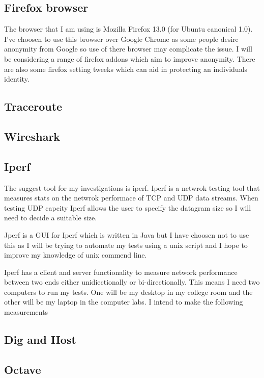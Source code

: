 \documentclass[12pt,a4paper,oneside]{article}
\begin{document}
\subsection{Firefox browser}
The browser that I am using is Mozilla Firefox 13.0 (for Ubuntu canonical 1.0). I've choosen to use this browser over Google Chrome as some people desire anonymity from Google so use of there browser may complicate the issue. I will be considering a range of firefox addons which aim to improve anonymity. There are also some firefox setting tweeks which can aid in protecting an individuals identity.

\subsection{Traceroute}
\subsection{Wireshark}
\subsection{Iperf}
The suggest tool for my investigations is iperf. Iperf is a netwrok testing tool that measures stats on the netwrok performace of TCP and UDP data streams.  When testing UDP capcity Iperf allows the user to specify the datagram size so I will need to decide a suitable size. 

Jperf is a GUI for Iperf which is written in Java but I have choosen not to use this as I will be trying to automate my tests using a unix script and I hope to improve my knowledge of unix commend line.

Iperf has a client and server functionality to measure network performance between two ends either unidiectionally or bi-directionally. This means I need two computers to run my tests. One will be my desktop in my college room and the other will be my laptop in the computer labs. I intend to make the following measurements
\subsection{Dig and Host}
\subsection{Octave}
\end{document}
